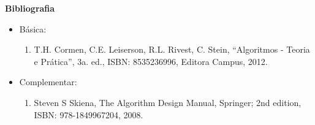 
\begin{snugshade}\begin{center}\textbf{
    Bibliografia
}\end{center}\end{snugshade}

\begin{itemize} 

  \item Básica:
	\begin{enumerate}
		\item T.H. Cormen, C.E. Leiserson, R.L. Rivest, C. Stein, ``Algoritmos - Teoria e Pr\'atica'', 3a. ed., ISBN: 8535236996, Editora Campus, 2012.
	\end{enumerate}
  \item Complementar:
	\begin{enumerate} 
		\item Steven S Skiena, The Algorithm Design Manual, Springer; 2nd edition, ISBN: 978-1849967204, 2008.\\
	\end{enumerate}
\end{itemize}
